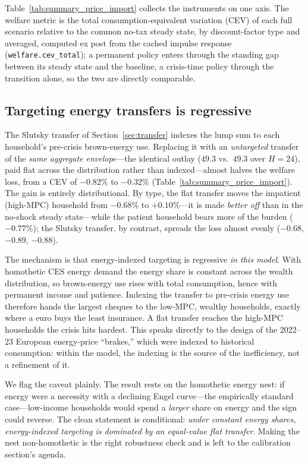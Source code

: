 \documentclass[11pt,a4paper]{article}
\begin{document}
Table~\ref{tab:summary_price_import} collects the instruments on one axis. The
welfare metric is the total consumption-equivalent variation (CEV) of each full
scenario relative to the common no-tax steady state, by discount-factor type and
averaged, computed ex post from the cached impulse response
(\texttt{welfare.cev\_total}); a permanent policy enters through the standing gap
between its steady state and the baseline, a crisis-time policy through the
transition alone, so the two are directly comparable.



\subsection{Targeting energy transfers is regressive}
\label{sec:flat}

The Slutsky transfer of Section~\ref{sec:transfer} indexes the lump sum to each
household's pre-crisis brown-energy use. Replacing it with an
\emph{untargeted} transfer of the \emph{same aggregate envelope}---the identical
outlay ($49.3$ vs.\ $49.3$ over $H=24$), paid flat across the distribution rather
than indexed---almost halves the welfare loss, from a CEV of $-0.82\%$ to
$-0.32\%$ (Table~\ref{tab:summary_price_import}). The gain is entirely
distributional. By type, the flat transfer moves the impatient (high-MPC)
household from $-0.68\%$ to $+0.10\%$---it is made \emph{better off} than in the
no-shock steady state---while the patient household bears more of the burden
($-0.77\%$); the Slutsky transfer, by contrast, spreads the loss almost evenly
($-0.68$, $-0.89$, $-0.88$).

The mechanism is that energy-indexed targeting is regressive \emph{in this
model}. With homothetic CES energy demand the energy share is constant across the
wealth distribution, so brown-energy use rises with total consumption, hence with
permanent income and patience. Indexing the transfer to pre-crisis energy use
therefore hands the largest cheques to the low-MPC, wealthy households, exactly
where a euro buys the least insurance. A flat transfer reaches the high-MPC
households the crisis hits hardest. This speaks directly to the design of the
2022--23 European energy-price ``brakes,'' which were indexed to historical
consumption: within the model, the indexing is the source of the inefficiency,
not a refinement of it.

We flag the caveat plainly. The result rests on the homothetic energy nest: if
energy were a necessity with a declining Engel curve---the empirically standard
case---low-income households would spend a \emph{larger} share on energy and the
sign could reverse. The clean statement is conditional: \emph{under constant
energy shares, energy-indexed targeting is dominated by an equal-value flat
transfer}. Making the nest non-homothetic is the right robustness check and is
left to the calibration section's agenda.
\end{document}
